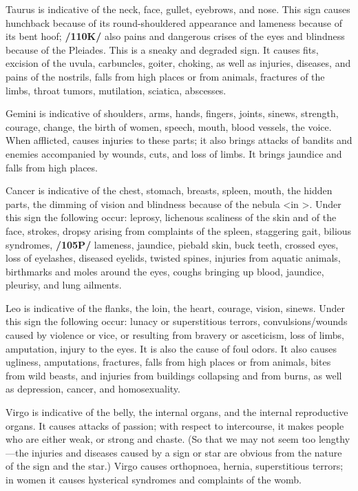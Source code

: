 Taurus \mn{\Taurus} is indicative of the neck, face, gullet, eyebrows, and nose. This sign causes hunchback because
of its round-shouldered appearance and lameness because of its bent hoof; \textbf{/110K/} also pains and dangerous crises of the eyes and blindness because of the Pleiades. This is a sneaky and degraded sign. It causes fits, excision of the uvula, carbuncles, goiter, choking, as well as injuries, diseases, and pains of the nostrils, falls from high places or from animals, fractures of the limbs, throat tumors, mutilation, sciatica, abscesses.

Gemini \mn{\Gemini} is indicative of shoulders, arms, hands, fingers, joints, sinews, strength, courage, change, the
birth of women, speech, mouth, blood vessels, the voice. When afflicted, \Gemini\xspace causes injuries to these parts; it also brings attacks of bandits and enemies accompanied by wounds, cuts, and loss of limbs. It brings jaundice and falls from high places.

Cancer \mn{\Cancer} is indicative of the chest, stomach, breasts, spleen, mouth, the hidden parts, the dimming of vision and blindness because of the nebula <in \Cancer>. Under this sign the following occur: leprosy,
lichenous scaliness of the skin and of the face, strokes, dropsy arising from complaints of the spleen, staggering gait, bilious syndromes, \textbf{/105P/} lameness, jaundice, piebald skin, buck teeth, crossed eyes, loss of eyelashes, diseased eyelids, twisted spines, injuries from aquatic animals, birthmarks and moles around the eyes, coughs bringing up blood, jaundice, pleurisy, and lung ailments.

Leo \mn{\Leo} is indicative of the flanks, the loin, the heart, courage, vision, sinews. Under this sign the
following occur: lunacy or superstitious terrors, convulsions/wounds caused by violence or vice, or resulting from bravery or asceticism, loss of limbs, amputation, injury to the eyes. It is also the cause of foul odors. It also causes ugliness, amputations, fractures, falls from high places or from animals, bites from wild beasts, and injuries from buildings collapsing and from burns, as well as depression, cancer, and
homosexuality.

Virgo \mn{\Virgo} is indicative of the belly, the internal organs, and the internal reproductive organs. It causes attacks of passion; with respect to intercourse, it makes people who are either weak, or strong and chaste.
(So that we may not seem too lengthy—the injuries and diseases caused by a sign or star are obvious from the nature of the sign and the star.) Virgo causes orthopnoea, hernia, superstitious terrors; in women it causes hysterical syndromes and complaints of the womb.

